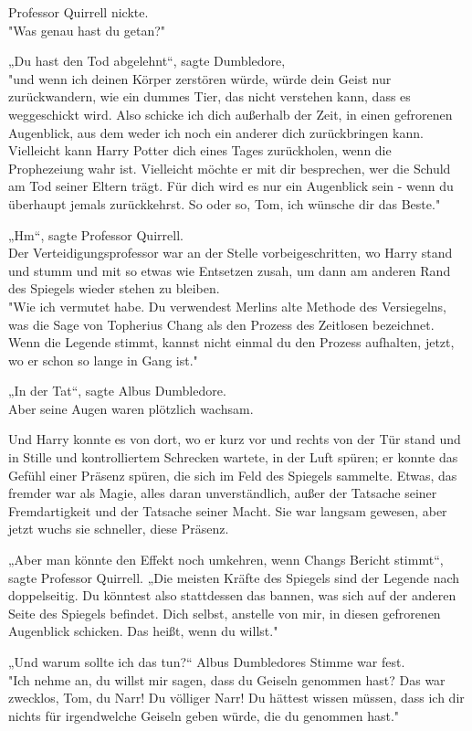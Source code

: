 {Professor Quirrell nickte.\\ "Was genau hast du getan?"

„Du hast den Tod abgelehnt“, sagte Dumbledore,\\ "und wenn ich deinen Körper zerstören würde, würde dein Geist nur zurückwandern, wie ein dummes Tier, das nicht verstehen kann, dass es weggeschickt wird. Also schicke ich dich außerhalb der Zeit, in einen gefrorenen Augenblick, aus dem weder ich noch ein anderer dich zurückbringen kann. Vielleicht kann Harry Potter dich eines Tages zurückholen, wenn die Prophezeiung wahr ist. Vielleicht möchte er mit dir besprechen, wer die Schuld am Tod seiner Eltern trägt. Für dich wird es nur ein Augenblick sein - wenn du überhaupt jemals zurückkehrst. So oder so, Tom, ich wünsche dir das Beste."

„Hm“, sagte Professor Quirrell.\\ Der Verteidigungsprofessor war an der Stelle vorbeigeschritten, wo Harry stand und stumm und mit so etwas wie Entsetzen zusah, um dann am anderen Rand des Spiegels wieder stehen zu bleiben.\\ "Wie ich vermutet habe. Du verwendest Merlins alte Methode des Versiegelns, was die Sage von Topherius Chang als den Prozess des Zeitlosen bezeichnet. Wenn die Legende stimmt, kannst nicht einmal du den Prozess aufhalten, jetzt, wo er schon so lange in Gang ist."

„In der Tat“, sagte Albus Dumbledore.\\ Aber seine Augen waren plötzlich wachsam.

Und Harry konnte es von dort, wo er kurz vor und rechts von der Tür stand und in Stille und kontrolliertem Schrecken wartete, in der Luft spüren; er konnte das Gefühl einer Präsenz spüren, die sich im Feld des Spiegels sammelte. Etwas, das fremder war als Magie, alles daran unverständlich, außer der Tatsache seiner Fremdartigkeit und der Tatsache seiner Macht. Sie war langsam gewesen, aber jetzt wuchs sie schneller, diese Präsenz.

„Aber man könnte den Effekt noch umkehren, wenn Changs Bericht stimmt“, sagte Professor Quirrell. „Die meisten Kräfte des Spiegels sind der Legende nach doppelseitig. Du könntest also stattdessen das bannen, was sich auf der anderen Seite des Spiegels befindet. Dich selbst, anstelle von mir, in diesen gefrorenen Augenblick schicken. Das heißt, wenn du willst."

„Und warum sollte ich das tun?“ Albus Dumbledores Stimme war fest.\\ "Ich nehme an, du willst mir sagen, dass du Geiseln genommen hast? Das war zwecklos, Tom, du Narr! Du völliger Narr! Du hättest wissen müssen, dass ich dir nichts für irgendwelche Geiseln geben würde, die du genommen hast."

}
